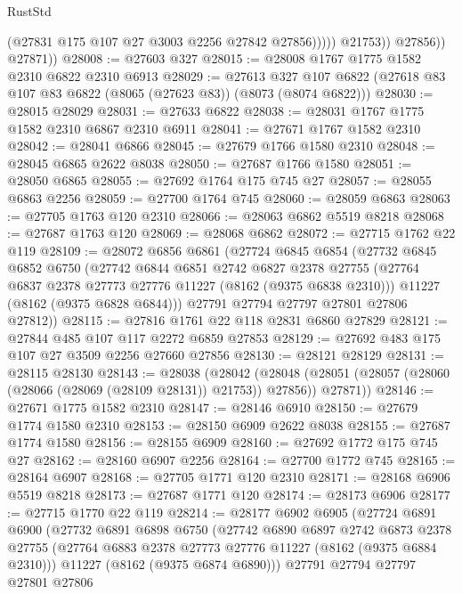 \begin{lexlean}{RustStd}
\begin{coremodule}
                        (@27831 @175 @107 @27 @3003 @2256 @27842 @27856)))))
                @21753))
            @27856))
        @27871))
@28008 := @27603 @327
@28015 := @28008 @1767 @1775 @1582 @2310 @6822 @2310 @6913
@28029 := @27613
    @327
    @107
    @6822
    (@27618 @83 @107 @83 @6822 (@8065 (@27623 @83)) (@8073 (@8074 @6822)))
@28030 := @28015 @28029
@28031 := @27633 @6822
@28038 := @28031 @1767 @1775 @1582 @2310 @6867 @2310 @6911
@28041 := @27671 @1767 @1582 @2310
@28042 := @28041 @6866
@28045 := @27679 @1766 @1580 @2310
@28048 := @28045 @6865 @2622 @8038
@28050 := @27687 @1766 @1580
@28051 := @28050 @6865
@28055 := @27692 @1764 @175 @745 @27
@28057 := @28055 @6863 @2256
@28059 := @27700 @1764 @745
@28060 := @28059 @6863
@28063 := @27705 @1763 @120 @2310
@28066 := @28063 @6862 @5519 @8218
@28068 := @27687 @1763 @120
@28069 := @28068 @6862
@28072 := @27715 @1762 @22 @119
@28109 := @28072
    @6856
    @6861
    (@27724
      @6845
      @6854
      (@27732
        @6845
        @6852
        @6750
        (@27742
          @6844
          @6851
          @2742
          @6827
          @2378
          @27755
          (@27764 @6837 @2378 @27773 @27776 @11227 (@8162 (@9375 @6838 @2310)))
          @11227
          (@8162 (@9375 @6828 @6844)))
        @27791
        @27794
        @27797
        @27801
        @27806
        @27812))
@28115 := @27816 @1761 @22 @118 @2831 @6860 @27829
@28121 := @27844 @485 @107 @117 @2272 @6859 @27853
@28129 := @27692 @483 @175 @107 @27 @3509 @2256 @27660 @27856
@28130 := @28121 @28129
@28131 := @28115 @28130
@28143 := @28038
    (@28042
      (@28048 (@28051 (@28057 (@28060 (@28066 (@28069 (@28109 @28131)) @21753)) @27856)) @27871))
@28146 := @27671 @1775 @1582 @2310
@28147 := @28146 @6910
@28150 := @27679 @1774 @1580 @2310
@28153 := @28150 @6909 @2622 @8038
@28155 := @27687 @1774 @1580
@28156 := @28155 @6909
@28160 := @27692 @1772 @175 @745 @27
@28162 := @28160 @6907 @2256
@28164 := @27700 @1772 @745
@28165 := @28164 @6907
@28168 := @27705 @1771 @120 @2310
@28171 := @28168 @6906 @5519 @8218
@28173 := @27687 @1771 @120
@28174 := @28173 @6906
@28177 := @27715 @1770 @22 @119
@28214 := @28177
    @6902
    @6905
    (@27724
      @6891
      @6900
      (@27732
        @6891
        @6898
        @6750
        (@27742
          @6890
          @6897
          @2742
          @6873
          @2378
          @27755
          (@27764 @6883 @2378 @27773 @27776 @11227 (@8162 (@9375 @6884 @2310)))
          @11227
          (@8162 (@9375 @6874 @6890)))
        @27791
        @27794
        @27797
        @27801
        @27806

\end{coremodule}
\end{lexlean}
